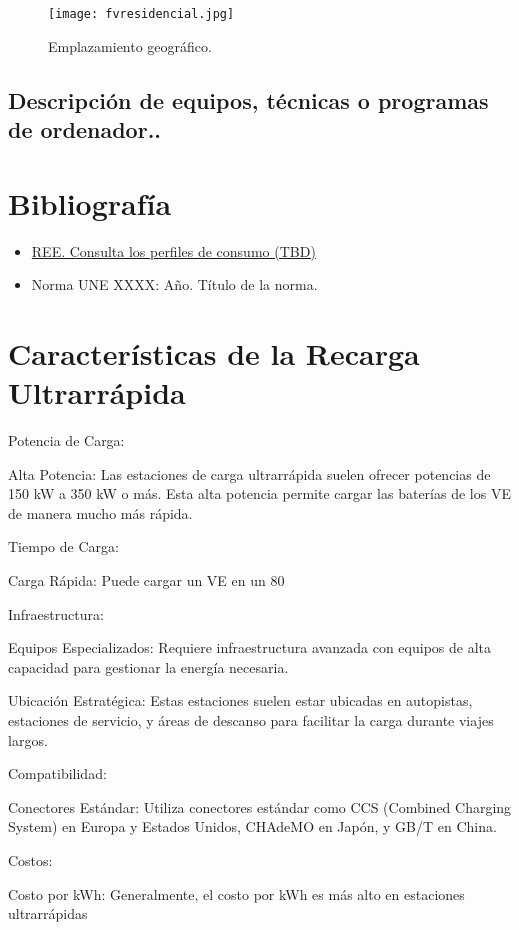 \documentclass[a4paper,12pt]{article}
\begin{document}
\begin{Form}
\begin{figure}[h]
    \centering
    \texttt{[image: fvresidencial.jpg]} %
    \caption{Emplazamiento geográfico.}
    \label{fig:etiqueta}
\end{figure}

\subsection{Descripción de equipos, técnicas o programas de ordenador..}







\newpage
\section*{Bibliografía}
\begin{itemize}
    \item \href{https://www.ree.es/es/clientes/generador/gestion-medidas-electricas/consulta-perfiles-de-consumo}{REE. Consulta los perfiles de consumo (TBD)}
    \item Norma UNE XXXX: Año. Título de la norma.
\end{itemize}





\section{Características de la Recarga Ultrarrápida}

Potencia de Carga:

Alta Potencia: Las estaciones de carga ultrarrápida suelen ofrecer potencias de 150 kW a 350 kW o más. Esta alta potencia permite cargar las baterías de los VE de manera mucho más rápida.

Tiempo de Carga:

Carga Rápida: Puede cargar un VE en un 80%

Infraestructura:

Equipos Especializados: Requiere infraestructura avanzada con equipos de alta capacidad para gestionar la energía necesaria.

Ubicación Estratégica: Estas estaciones suelen estar ubicadas en autopistas, estaciones de servicio, y áreas de descanso para facilitar la carga durante viajes largos.

Compatibilidad:

Conectores Estándar: Utiliza conectores estándar como CCS (Combined Charging System) en Europa y Estados Unidos, CHAdeMO en Japón, y GB/T en China.

Costos:

Costo por kWh: Generalmente, el costo por kWh es más alto en estaciones ultrarrápidas

\end{Form}
\end{document}

